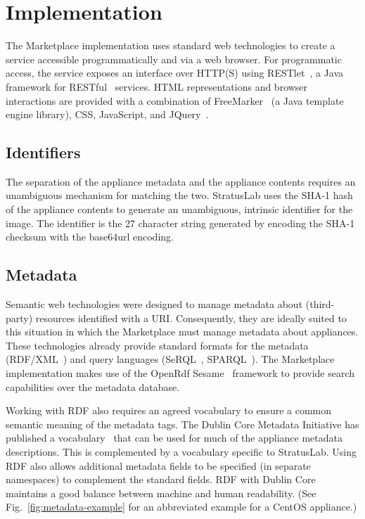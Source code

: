 \section{Implementation}
\label{sec:implementation}

The Marketplace implementation uses standard web technologies to
create a service accessible programmatically and via a web browser.
For programmatic access, the service exposes an interface over HTTP(S)
using RESTlet~\cite{restlet}, a Java framework for RESTful~\cite{rest}
services.  HTML representations and browser interactions are provided
with a combination of FreeMarker~\cite{freemarker} (a Java template
engine library), CSS, JavaScript, and JQuery~\cite{jquery}.

\subsection{Identifiers}

The separation of the appliance metadata and the appliance contents
requires an unambiguous mechanism for matching the two.  StratusLab
uses the SHA-1 hash of the appliance contents to generate an
unambiguous, intrinsic identifier for the image.  The identifier is
the 27 character string generated by encoding the SHA-1 checksum with
the base64url encoding.

\subsection{Metadata}



Semantic web technologies were designed to manage metadata about
(third-party) resources identified with a URI\@.  Consequently, they
are ideally suited to this situation in which the Marketplace must
manage metadata about appliances.  These technologies already provide
standard formats for the metadata (RDF/XML~\cite{rdfxml, rdfprimer,
  rdfschema}) and query languages (SeRQL~\cite{serql},
SPARQL~\cite{sparql}).  The Marketplace implementation makes use of
the OpenRdf Sesame~\cite{sesame} framework to provide search
capabilities over the metadata database.

Working with RDF also requires an agreed vocabulary to ensure a common
semantic meaning of the metadata tags.  The Dublin Core Metadata
Initiative has published a vocabulary~\cite{dcterms} that can be used
for much of the appliance metadata descriptions.  This is complemented
by a vocabulary specific to StratusLab\@.  Using RDF also allows
additional metadata fields to be specified (in separate namespaces) to
complement the standard fields. RDF with Dublin Core maintains a good
balance between machine and human readability. (See
Fig.~\ref{fig:metadata-example} for an abbreviated example for a
CentOS appliance.)

